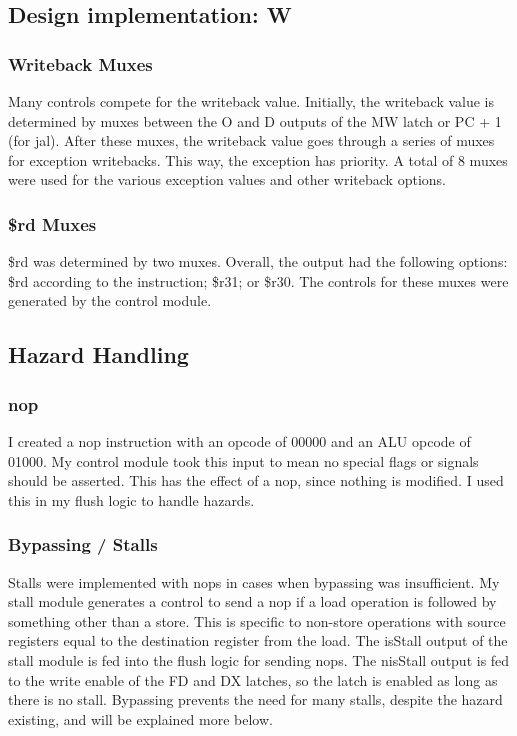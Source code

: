 \documentclass[letterpaper]{article} %
\begin{document}
\subsection{Design implementation: W}
\subsubsection{Writeback Muxes}
Many controls compete for the writeback value. Initially, the writeback value is determined by muxes between the O and D outputs of the MW latch or PC + 1 (for jal). After these muxes, the writeback value goes through a series of muxes for exception writebacks. This way, the exception has priority. A total of 8 muxes were used for the various exception values and other writeback options.
\subsubsection{\$rd Muxes}
\$rd was determined by two muxes. Overall, the output had the following options: \$rd according to the instruction; \$r31; or \$r30. The controls for these muxes were generated by the control module.
\subsection{Hazard Handling}
\subsubsection{nop}
I created a nop instruction with an opcode of 00000 and an ALU opcode of 01000. My control module took this input to mean no special flags or signals should be asserted. This has the effect of a nop, since nothing is modified. I used this in my flush logic to handle hazards.
\subsubsection{Bypassing / Stalls}
Stalls were implemented with nops in cases when bypassing was insufficient. My stall module generates a control to send a nop if a load operation is followed by something other than a store. This is specific to non-store operations with source registers equal to the destination register from the load. The isStall output of the stall module is fed into the flush logic for sending nops. The nisStall output is fed to the write enable of the FD and DX latches, so the latch is enabled as long as there is no stall. Bypassing prevents the need for many stalls, despite the hazard existing, and will be explained more below. 
\end{document}
